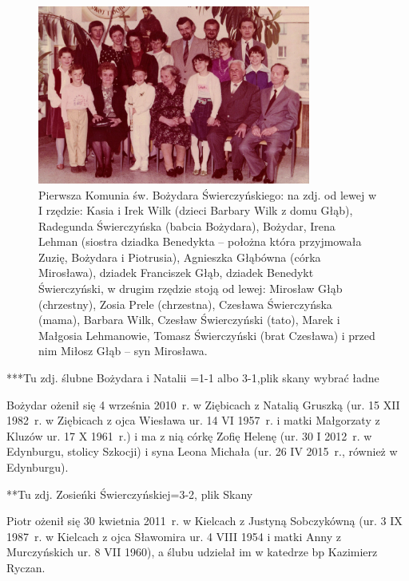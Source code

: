 \begin{figure}[!hb]
\begin{center}
\includegraphics[width=0.8\textwidth]{zdjecia/komunia_bozydara_swierczynskiego_zbiorowe.jpg}
\caption[Pierwsza Komunia św. Bożydara Świerczyńskiego -- zdjęcie zbiorowe]{Pierwsza Komunia św. Bożydara Świerczyńskiego: na zdj. od lewej w I rzędzie: Kasia i Irek Wilk (dzieci Barbary Wilk z domu Głąb), Radegunda Świerczyńska (babcia Bożydara), Bożydar, Irena Lehman (siostra dziadka Benedykta -- położna która przyjmowała Zuzię, Bożydara i Piotrusia), Agnieszka Głąbówna (córka Mirosława), dziadek Franciszek Głąb, dziadek Benedykt Świerczyński, w drugim rzędzie stoją od lewej: Mirosław Głąb (chrzestny), Zosia Prele (chrzestna), Czesława Świerczyńska (mama), Barbara Wilk, Czesław Świerczyński (tato), Marek i Małgosia Lehmanowie, Tomasz Świerczyński (brat Czesława) i przed nim Miłosz Głąb -- syn Mirosława.}
\label{rys:komunia_bozydara_swierczynskiego_zbiorowe}
\end{center}
\end{figure}

***Tu zdj. ślubne Bożydara i Natalii =1-1 albo 3-1,plik skany
wybrać ładne

Bożydar ożenił się 4 września 2010~r. w Ziębicach z Natalią Gruszką (ur. 15 XII 1982~r. w Ziębicach z ojca Wiesława ur. 14 VI 1957~r. i matki Małgorzaty z Kluzów ur. 17 X 1961~r.) i ma z nią córkę Zofię Helenę (ur. 30 I 2012~r. w Edynburgu, stolicy Szkocji) i syna Leona Michała (ur. 26 IV 2015~r., również w Edynburgu).

**Tu zdj. Zosieńki Świerczyńskiej=3-2, plik Skany


Piotr ożenił się 30 kwietnia 2011~r. w Kielcach z Justyną Sobczykówną (ur. 3 IX 1987~r. w Kielcach z ojca Sławomira ur. 4 VIII 1954 i matki Anny z Murczyńskich ur. 8 VII 1960), a ślubu udzielał im w katedrze bp Kazimierz Ryczan.


